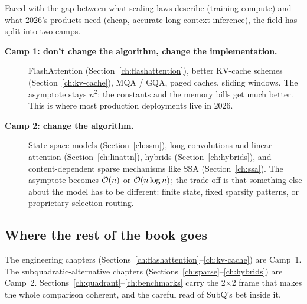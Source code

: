 Faced with the gap between what scaling laws describe (training compute)
and what 2026's products need (cheap, accurate long-context
inference), the field has split into two camps.

\begin{description}
\item[\textnormal{\textbf{Camp 1: don't change the algorithm, change the
implementation.}}] FlashAttention (Section~\ref{ch:flashattention}),
better KV-cache schemes (Section~\ref{ch:kv-cache}), MQA / GQA, paged
caches, sliding windows. The asymptote stays \(n^2\); the constants and
the memory bills get much better. This is where most production
deployments live in 2026.

\item[\textnormal{\textbf{Camp 2: change the algorithm.}}] State-space models
(Section~\ref{ch:ssm}), long convolutions and linear attention
(Section~\ref{ch:linattn}), hybrids (Section~\ref{ch:hybrids}), and
content-dependent sparse mechanisms like SSA
(Section~\ref{ch:ssa}). The asymptote becomes
\(\mathcal{O}(n)\) or \(\mathcal{O}(n \log n)\); the trade-off is that something else
about the model has to be different: finite state, fixed sparsity
patterns, or proprietary selection routing.
\end{description}


\subsection{Where the rest of the book goes}

The engineering chapters (Sections~\ref{ch:flashattention}--\ref{ch:kv-cache}) are Camp~1.
The subquadratic-alternative chapters (Sections~\ref{ch:sparse}--\ref{ch:hybrids}) are Camp~2.
Sections~\ref{ch:quadrant}--\ref{ch:benchmarks} carry the 2$\times$2
frame that makes the whole comparison coherent, and the careful read of
SubQ's bet inside it.
